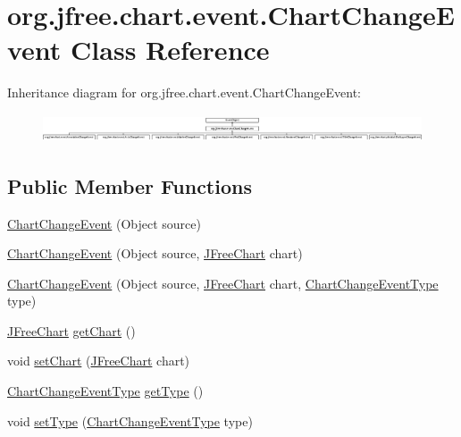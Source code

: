 \hypertarget{classorg_1_1jfree_1_1chart_1_1event_1_1_chart_change_event}{}\section{org.\+jfree.\+chart.\+event.\+Chart\+Change\+Event Class Reference}
\label{classorg_1_1jfree_1_1chart_1_1event_1_1_chart_change_event}
Inheritance diagram for org.\+jfree.\+chart.\+event.\+Chart\+Change\+Event\+:\begin{figure}[H]
\begin{center}
\leavevmode
\includegraphics[height=0.842105cm]{classorg_1_1jfree_1_1chart_1_1event_1_1_chart_change_event}
\end{center}
\end{figure}
\subsection*{Public Member Functions}
\begin{DoxyCompactItemize}
\item 
\mbox{\hyperlink{classorg_1_1jfree_1_1chart_1_1event_1_1_chart_change_event_a9868a967758f5d748d0e5fbcbb3703fb}{Chart\+Change\+Event}} (Object source)
\item 
\mbox{\hyperlink{classorg_1_1jfree_1_1chart_1_1event_1_1_chart_change_event_a0c6431e468461dc97ec3e098107f8013}{Chart\+Change\+Event}} (Object source, \mbox{\hyperlink{classorg_1_1jfree_1_1chart_1_1_j_free_chart}{J\+Free\+Chart}} chart)
\item 
\mbox{\hyperlink{classorg_1_1jfree_1_1chart_1_1event_1_1_chart_change_event_aa4cd0f01b03b0fe72d20c5fed21ed8ab}{Chart\+Change\+Event}} (Object source, \mbox{\hyperlink{classorg_1_1jfree_1_1chart_1_1_j_free_chart}{J\+Free\+Chart}} chart, \mbox{\hyperlink{classorg_1_1jfree_1_1chart_1_1event_1_1_chart_change_event_type}{Chart\+Change\+Event\+Type}} type)
\item 
\mbox{\hyperlink{classorg_1_1jfree_1_1chart_1_1_j_free_chart}{J\+Free\+Chart}} \mbox{\hyperlink{classorg_1_1jfree_1_1chart_1_1event_1_1_chart_change_event_ada4842dc3257a20fd3cc535eb3e4136c}{get\+Chart}} ()
\item 
void \mbox{\hyperlink{classorg_1_1jfree_1_1chart_1_1event_1_1_chart_change_event_a283a2b236228c7ba9910cd78aa6a4c26}{set\+Chart}} (\mbox{\hyperlink{classorg_1_1jfree_1_1chart_1_1_j_free_chart}{J\+Free\+Chart}} chart)
\item 
\mbox{\hyperlink{classorg_1_1jfree_1_1chart_1_1event_1_1_chart_change_event_type}{Chart\+Change\+Event\+Type}} \mbox{\hyperlink{classorg_1_1jfree_1_1chart_1_1event_1_1_chart_change_event_a3404ca7113b90ada75a44e4a23928651}{get\+Type}} ()
\item 
void \mbox{\hyperlink{classorg_1_1jfree_1_1chart_1_1event_1_1_chart_change_event_aa8fada4be5c6748fc294c25a289ca97f}{set\+Type}} (\mbox{\hyperlink{classorg_1_1jfree_1_1chart_1_1event_1_1_chart_change_event_type}{Chart\+Change\+Event\+Type}} type)
\end{DoxyCompactItemize}


